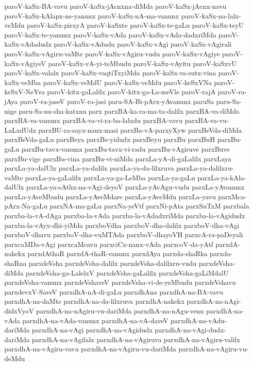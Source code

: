 {paroV-kaSx-BA-vavu
paroV-kaSx-jAcnxna-diMda
paroV-kaSx-jAcnx-navu
paroV-kaSx-kAlapx-ne-yanunx
paroV-kaSx-nA-ma-vanunx
paroV-kaSx-na-lalx-veMdu
paroV-kaSx-pirxyA
paroV-kaSxte
paroV-kaSx-te-gaLu
paroV-kaSx-teyU
paroV-kaSx-te-yanunx
paroV-kaSx-vAda
paroV-kaSx-vAda-dadxriMda
paroV-kaSx-vAdadudx
paroV-kaSx-vAdudu
paroV-kaSx-vAgi
paroV-kaSx-vAgirali
paroV-kaSx-vAgiru-vaMte
paroV-kaSx-vAgiru-vudu
paroV-kaSx-vAgiye
paroV-kaSx-vAgiyeV
paroV-kaSx-vA-yi-teMbudu
paroV-kaSx-vAyitu
paroV-kaSxvU
paroV-kaSx-valalx
paroV-kaSx-vaqtiTxyiMda
paroV-kaSx-va-sutx-vina
paroV-kaSx-veMba
paroV-kaSx-veMdU
paroV-kaSx-veMdu
paroV-keSxVNa
paroV-keSxV-NeYva
paroV-kitx-gaLalilx
paroV-kitx-ga-La-meVle
paroV-rajA
paroV-ra-jAya
paroV-ra-jaseV
paroV-ra-jasi
paru-SA-Bi-pArx-yAvanunx
paruSa
paru-Sa-nige
paru-Sa-nu-sha-katxnu
parx
parxBA-ka-ra-ma-ta-dalilx
parxBA-va-diMda
parxBA-va-vanunx
parxBA-va-vi-ra-ba-lalxdu
parxBA-vavu
parxBA-va-vu-LaLxdUdx
parxBU-ra-sayx-nanx-masi
parxBa-vA-parxyXyw
parxBeVda-diMda
parxBeVda-gaLu
parxBeya
parxBe-yidudx
parxBeyu
parxBu
parxBuH
parxBu-gaLu
parxBu-tavx-vanunx
parxBu-tavx-vi-radu
parxBu-vAgiruve
parxBuve
parxBu-vige
parxBu-vina
parxBu-vi-niMda
parxLa-yA-di-gaLalilx
parxLaya
parxLa-ya-dalUlx
parxLa-ya-dalilx
parxLa-ya-da-lilxruva
parxLa-ya-dalilxru-vaMte
parxLa-ya-gaLalilx
parxLa-ya-ga-LeMba
parxLa-ya-gaLu
parxLa-ya-kAla-dalUlx
parxLa-ya-sAthx-na-vAgi-deyoV
parxLa-yAvAgu-vudu
parxLa-yAvanunx
parxLa-yAveMbudu
parxLa-yAveMdare
parxLa-yAveMdu
parxLa-yavu
parxMca-pArx-Na-gaLu
parxNA-ma-gaLu
parxNa-yeVtf
parxNi-pAta
parxSuTxM
parxbala
parxba-la-vA-dAga
parxba-la-vAda
parxba-la-vAdadxriMda
parxba-la-vAgidudx
parxba-la-vAyx-dhi-yiMda
parxboVdha
parxboV-dha-dalilx
parxboV-dha-vAgi
parxboV-dhavu
parxboV-dha-vuMTAda
parxboV-dhayoVH
parxcA-ra-paDeyali
parxcaMDa-vAgi
parxcaMcavu
parxciCx-nanx-vAda
parxcoV-da-yAtf
parxdA-nakekx
parxdAthaR
parxdA-thaR-vanunx
parxdAya
parxda-shaRka
parxda-shaRna
parxdeVsha
parxdeVsha-dalilx
parxdeVsha-dalilxru-vudu
parxdeVsha-diMda
parxdeVsha-ga-LalelxV
parxdeVsha-gaLalilx
parxdeVsha-gaLiMdalU
parxdeVsha-vanunx
parxdeVshaveV
parxdeVsha-vi-de-yeMbudu
parxdeVshavu
parxdevxV-SaveV
parxdhA-nA-di-gaLu
parxdhAna
parxdhA-na-BA-vavu
parxdhA-na-daMte
parxdhA-na-da-lilxruva
parxdhA-nakekx
parxdhA-na-nAgi-didxVyoV
parxdhA-na-nAgiru-vu-dariMda
parxdhA-na-nAgu-venu
parxdhA-na-vAda
parxdhA-na-vAda-vanunx
parxdhA-na-vA-daveV
parxdhA-na-vAdu-dariMda
parxdhA-na-vAgi
parxdhA-na-vAgidudx
parxdhA-na-vAgi-dudx-dariMda
parxdhA-na-vAgilalx
parxdhA-na-vAgiruva
parxdhA-na-vAgiru-valilx
parxdhA-na-vAgiru-vavu
parxdhA-na-vAgiru-vu-dariMda
parxdhA-na-vAgiru-vu-deMdu
}
